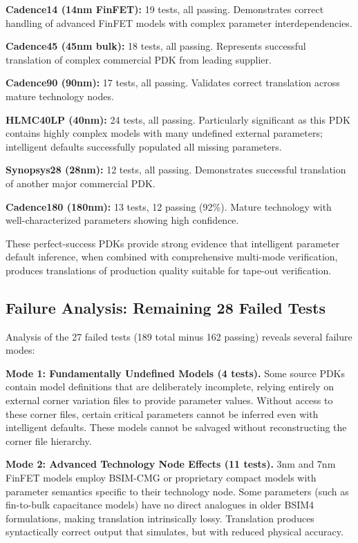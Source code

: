 \documentclass[10pt,twocolumn]{article}
\begin{document}
\textbf{Cadence14 (14nm FinFET):} 19 tests, all passing. Demonstrates correct handling of advanced FinFET models with complex parameter interdependencies.

\textbf{Cadence45 (45nm bulk):} 18 tests, all passing. Represents successful translation of complex commercial PDK from leading supplier.

\textbf{Cadence90 (90nm):} 17 tests, all passing. Validates correct translation across mature technology nodes.

\textbf{HLMC40LP (40nm):} 24 tests, all passing. Particularly significant as this PDK contains highly complex models with many undefined external parameters; intelligent defaults successfully populated all missing parameters.

\textbf{Synopsys28 (28nm):} 12 tests, all passing. Demonstrates successful translation of another major commercial PDK.

\textbf{Cadence180 (180nm):} 13 tests, 12 passing (92\%). Mature technology with well-characterized parameters showing high confidence.

These perfect-success PDKs provide strong evidence that intelligent parameter default inference, when combined with comprehensive multi-mode verification, produces translations of production quality suitable for tape-out verification.

\subsection{Failure Analysis: Remaining 28 Failed Tests}

Analysis of the 27 failed tests (189 total minus 162 passing) reveals several failure modes:

\textbf{Mode 1: Fundamentally Undefined Models (4 tests).} Some source PDKs contain model definitions that are deliberately incomplete, relying entirely on external corner variation files to provide parameter values. Without access to these corner files, certain critical parameters cannot be inferred even with intelligent defaults. These models cannot be salvaged without reconstructing the corner file hierarchy.

\textbf{Mode 2: Advanced Technology Node Effects (11 tests).} 3nm and 7nm FinFET models employ BSIM-CMG or proprietary compact models with parameter semantics specific to their technology node. Some parameters (such as fin-to-bulk capacitance models) have no direct analogues in older BSIM4 formulations, making translation intrinsically lossy. Translation produces syntactically correct output that simulates, but with reduced physical accuracy.
\end{document}

